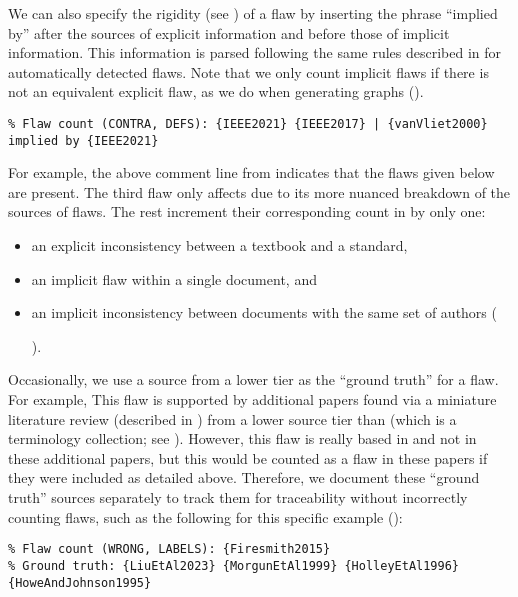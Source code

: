 We can also specify the rigidity (see ) of a flaw by inserting
the phrase ``implied by'' after the sources of explicit information and before
those of implicit information. This information is parsed following the same
rules described in  for automatically
detected flaws. Note that we only count implicit flaws if there is not an
equivalent explicit flaw, as we do when generating graphs ().
\begin{displayquote}
    \texttt{\% Flaw count (CONTRA, DEFS): \{IEEE2021\} \{IEEE2017\} |
        \displayNL \{vanVliet2000\} implied by \{IEEE2021\}}
\end{displayquote}
For example, the above comment line\utd{} from  indicates that the
flaws given below are present. The third flaw only affects 
due to its more nuanced breakdown of the sources of flaws. The rest increment
their corresponding count in 
by only one:
\begin{itemize}
    \item an explicit inconsistency between a textbook and a standard,
    \item an implicit flaw within a single document, and
    \item an implicit inconsistency between documents with the same set of
          authors (\begin{NoHyper}\citeauthor{IEEE2022}\end{NoHyper}).
\end{itemize}

Occasionally, we use a source from a lower tier as the ``ground truth'' for a
flaw. For example, \tolTestFlaw*{} This flaw is supported
by additional papers found via a miniature literature review (described in
) from a lower source tier than \citep{Firesmith2015}
(which is a terminology collection; see ). However, this flaw
is really based in \citep{Firesmith2015} and not in these
additional papers, but this would be counted as a flaw in these papers if they
were included as detailed above. Therefore, we document these ``ground
truth'' sources separately to track them for traceability without incorrectly
counting flaws, such as the following for this specific example
():
\begin{displayquote}
    \texttt{\% Flaw count (WRONG, LABELS): \{Firesmith2015\}\\
        \% Ground truth: \{LiuEtAl2023\} \{MorgunEtAl1999\} \{HolleyEtAl1996\}
        \displayNL \{HoweAndJohnson1995\}}
\end{displayquote}

